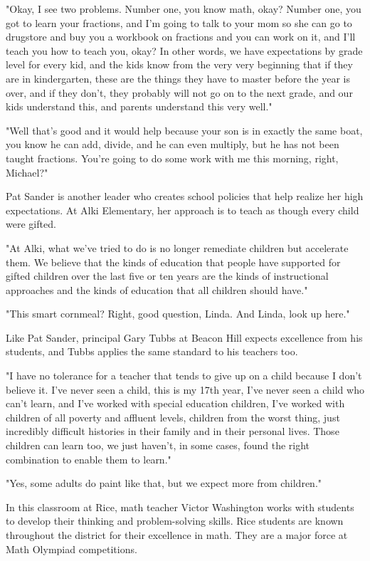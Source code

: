 "Okay, I see two problems.
Number one, you know math, okay?
Number one, you got to learn your fractions, and I'm going to talk to your mom so she can go to drugstore and buy you a workbook on fractions and you can work on it, and I'll teach you how to teach you, okay?
In other words, we have expectations by grade level for every kid, and the kids know from the very very beginning that if they are in kindergarten, these are the things they have to master before the year is over, and if they don't, they probably will not go on to the next grade, and our kids understand this, and parents understand this very well."

"Well that's good and it would help because your son is in exactly the same boat, you know he can add, divide, and he can even multiply, but he has not been taught fractions.
You're going to do some work with me this morning, right, Michael?"

Pat Sander is another leader who creates school policies that help realize her high expectations.
At Alki Elementary, her approach is to teach as though every child were gifted.

"At Alki, what we've tried to do is no longer remediate children but accelerate them.
We believe that the kinds of education that people have supported for gifted children over the last five or ten years are the kinds of instructional approaches and the kinds of education that all children should have."

"This smart cornmeal?
Right, good question, Linda.
And Linda, look up here."

Like Pat Sander, principal Gary Tubbs at Beacon Hill expects excellence from his students, and Tubbs applies the same standard to his teachers too.

"I have no tolerance for a teacher that tends to give up on a child because I don't believe it.
I've never seen a child, this is my 17th year, I've never seen a child who can't learn, and I've worked with special education children, I've worked with children of all poverty and affluent levels, children from the worst thing, just incredibly difficult histories in their family and in their personal lives.
Those children can learn too, we just haven't, in some cases, found the right combination to enable them to learn."

"Yes, some adults do paint like that, but we expect more from children."

In this classroom at Rice, math teacher Victor Washington works with students to develop their thinking and problem-solving skills.
Rice students are known throughout the district for their excellence in math.
They are a major force at Math Olympiad competitions.

